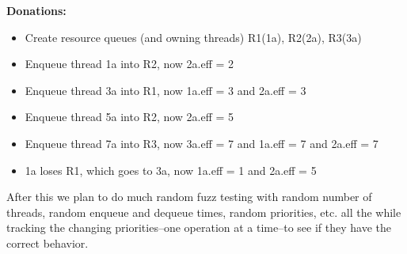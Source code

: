 \documentclass[11pt]{article}
\begin{document}
\textbf{Donations:}
\begin{itemize}
\item Create resource queues (and owning threads) R1(1a), R2(2a), R3(3a)
\item Enqueue thread 1a into R2, now 2a.eff = 2
\item Enqueue thread 3a into R1, now 1a.eff = 3 and 2a.eff = 3
\item Enqueue thread 5a into R2, now 2a.eff = 5
\item Enqueue thread 7a into R3, now 3a.eff = 7 and 1a.eff = 7 and 2a.eff = 7
\item 1a loses R1, which goes to 3a, now 1a.eff = 1 and 2a.eff = 5
\end{itemize}
After this we plan to do much random fuzz testing with random number of threads, random enqueue and dequeue times, random priorities, etc. all the while tracking the changing priorities--one operation at a time--to see if they have the correct behavior.
\end{document}
